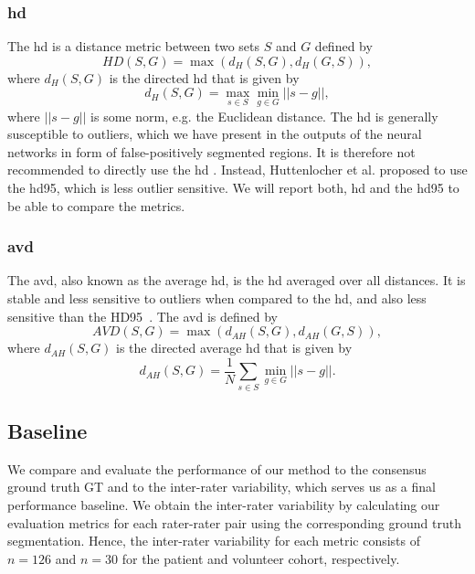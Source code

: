 \subsubsection{\acrlong{hd}}
The \gls{hd} is a distance metric between two sets $S$ and $G$ defined by
\begin{equation}
   HD(S, G) = \max(d_{H}(S,G),d_{H}(G,S)),
   \label{eq:hd}
\end{equation}
where $d_{H}(S,G)$ is the directed \gls{hd} that is given by
\begin{equation}
   d_{H}(S, G) = \max\limits_{s \in S} \min\limits_{g \in G} ||s-g||,
   \label{eq:dhd}
\end{equation}
where $||s-g||$ is some norm, e.g. the Euclidean distance. The \gls{hd} is generally susceptible to outliers, which we have present in the outputs of the neural networks in form of false-positively segmented regions. It is therefore not recommended to directly use the \acrshort{hd} \cite{Taha2015MetricsTool}. Instead, Huttenlocher et al. \cite{Huttenlocher1993ComparingDistance} proposed to use the \gls{hd95}, which is less outlier sensitive. We will report both, \gls{hd} and the \gls{hd95} to be able to compare the metrics.

\subsubsection{\acrlong{avd}}
The \gls{avd}, also known as the average \gls{hd}, is the \gls{hd} averaged over all distances. It is stable and less sensitive to outliers when compared to the \gls{hd}, and also less sensitive than the HD95~\cite{Taha2015MetricsTool}. The \gls{avd} is defined by
\begin{equation}
   AVD(S, G) = \max(d_{AH}(S,G),d_{AH}(G,S)),
   \label{eq:avd}
\end{equation}
where $d_{AH}(S,G)$ is the directed average \gls{hd} that is given by
\begin{equation}
   d_{AH}(S, G) = \frac{1}{N} \sum\limits_{s \in S} \min\limits_{g \in G} ||s-g||.
   \label{eq:dahd}
\end{equation}

\subsection{Baseline} \label{sec:eval_baseline}
We compare and evaluate the performance of our method to the consensus ground truth GT and to the inter-rater variability, which serves us as a final performance baseline. We obtain the inter-rater variability by calculating our evaluation metrics for each rater-rater pair using the corresponding ground truth segmentation. Hence, the inter-rater variability for each metric consists of $n = 126$ and $n = 30$ for the patient and volunteer cohort, respectively.

